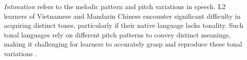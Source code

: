 \documentclass[11pt]{article}
\begin{document}

\textit{Intonation} refers to the melodic pattern and pitch variations in speech. L2 learners of Vietnamese and Mandarin Chinese encounter significant difficulty in acquiring distinct tones, particularly if their native language lacks tonality. %
Such tonal languages rely on different pitch patterns to convey distinct meanings, making it challenging for learners to accurately grasp and reproduce these tonal variations \cite{nguyen2014intonation, chen2015icall}.




\end{document}
